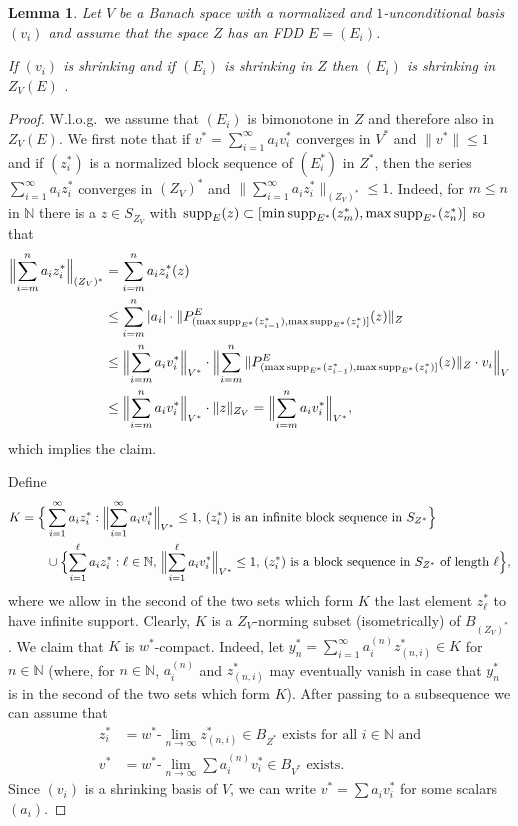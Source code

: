 \documentclass[11pt,leqno]{amsart}
\newtheorem{lem}[thm]{Lemma}
\theoremstyle{definition}
\newcommand{\N}{\mathbb{N}}
\newcommand{\supp}{{\rm supp}}
\begin{document}
\begin{lem}\label{L:2.4}
Let $V$ be a Banach space with a normalized and $1$-unconditional basis $(v_i)$
 and assume that the space $Z$ has an FDD $E=(E_i)$.

    If $(v_i)$ is shrinking and if $(E_i)$ is shrinking in $Z$ then
 $(E_i)$ is shrinking in $Z_V(E)$ .
\end{lem}
\begin{proof} 
  W.l.o.g.~we assume that $(E_i)$ is bimonotone in $Z$ and therefore
  also in $Z_V(E)$. We first note that if $v^*=\sum_{i=1}^\infty a_i
  v^*_i$ converges in $V^*$ and  $\|v^*\|\le 1$ and if $(z_i^*)$ is a
  normalized block sequence of $(E^*_i)$ in $Z^*$, then the series
  $\sum_{i=1}^\infty a_i z^*_i$ converges in $(Z_V)^*$ and
  $\|\sum_{i=1}^\infty a_i z^*_i\|_{(Z_V)^*}\le 1$. Indeed, for $m\le n$
  in $\N$ there is a $z\in S_{Z_V}$ with
  $\supp_E(z)\subset[\min\supp_{E^*}(z_m^*),\max\supp_{E^*}(z_n^*)]$ so
  that
  \begin{align*}
    \Bigl\|\sum_{i=m}^n a_i z_i^*\Bigr\|_{(Z_V)^*}&=\sum_{i=m}^n a_i
    z^*_i(z)\\
    &\leq\sum_{i=m}^n |a_i|\cdot \|P^E_{(\max\supp_{E^*}
      (z^*_{i-1}),\max\supp_{E^*}(z^*_{i})]}(z)\|_Z\\
      &\le \Bigl\|\sum_{i=m}^n a_i v_i^*\Bigr\|_{V^*} \cdot
      \Bigl\|\sum_{i=m}^n\|P^E_{(\max\supp_{E^*}(z^*_{i-1}),
	\max\supp_{E^*}(z^*_{i})]}(z) \|_Z\cdot v_i \Bigr\|_{V}\\
	&\le\Bigl\|\sum_{i=m}^n a_iv_i^*\Bigr\|_{V^*}\cdot\|z\|_{Z_V}=
        \Bigl\|\sum_{i=m}^n  a_iv_i^*\Bigr\|_{V^*},
  \end{align*}
  which implies the claim.
  
  Define
  \begin{align*}
    K= \Bigl\{&\sum_{i=1}^\infty a_iz^*_i: \Bigl\|\sum_{i=1}^\infty
    a_i v^*_i\Bigr\|_{V^*}\le 1,\, (z_i^*)\text{ is an infinite block
      sequence in }S_{Z^*}\Bigr\}\\
    &\cup  \Bigl\{\sum_{i=1}^\ell a_i z^*_i:\ell\in\N,\,
    \Bigl\|\sum_{i=1}^\ell a_i v^*_i\Bigr\|_{V^*}\le 1,\,
    (z_i^*)\text{ is a block sequence in }S_{Z^*} \text{ of length
    }\ell\Bigr\},
  \end{align*}
  where  we allow in the second of the two sets which form $K$ the
  last element  $z^*_{\ell}$ to have infinite support.  Clearly, $K$
  is a $Z_V$-norming subset (isometrically) of $B_{(Z_V)^*}$. We claim
  that $K$ is $w^*$-compact. Indeed, let $y^*_n=\sum_{i=1}^\infty
  a^{(n)}_i z^*_{(n,i)}\in K$ for $n\in\N$ (where, for $n\in\N$,
  $a^{(n)}_i$ and $z^*_{(n,i)}$ may eventually vanish in case that
  $y^*_n$ is  in the second of the two sets which form $K$). After
  passing to a subsequence we can assume that
  \begin{align*}
    z^*_i&=\text{$w^*$-$\lim_{n\to\infty}$} z^*_{(n,i)} \in B_{Z^*}
    \text{ exists for all }i\in\N  \text{ and}\\
    v^*&=\text{$w^*$-$\lim_{n\to\infty}$} \sum a_i^{(n)} v^*_i  \in
    B_{V^*} \text{ exists.}
  \end{align*}
  Since $(v_i)$ is a shrinking basis of $V$, we can write $v^*=\sum
  a_i v_i^*$ for some scalars $(a_i)$. 
  

\end{proof}
\end{document}

